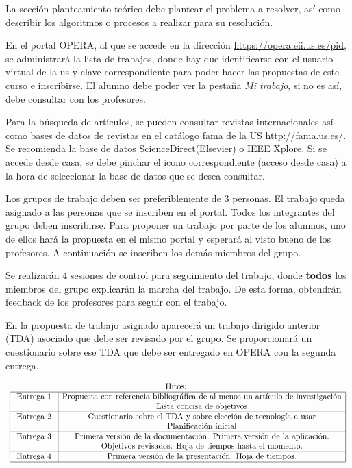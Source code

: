 \documentclass{pid}
\begin{document}
La sección planteamiento teórico debe plantear el problema a resolver, así como describir los algoritmos o procesos a realizar para su resolución.

En el portal OPERA, al que se accede en la dirección \url{https://opera.eii.us.es/pid}, se administrará la lista de trabajos, donde hay que identificarse con el usuario virtual de la us y clave correspondiente para poder hacer las propuestas de este curso e inscribirse. El alumno debe poder ver la pestaña {\it Mi trabajo}, si no es así, debe consultar con los profesores.

Para la búsqueda de artículos, se pueden consultar revistas internacionales así como bases de datos de revistas en el catálogo fama de la US \url{http://fama.us.es/}. Se recomienda la base de datos ScienceDirect(Elsevier) o IEEE Xplore. Si se accede desde casa, se debe pinchar el icono correspondiente (acceso desde casa) a la hora de seleccionar la base de datos que se desea consultar.

Los grupos de trabajo deben ser preferiblemente de $3$ personas. El trabajo queda asignado a las personas que se inscriben en el portal. Todos los integrantes del grupo deben inscribirse. Para proponer un trabajo por parte de los alumnos, uno de ellos hará la propuesta en el mismo portal y esperará al visto bueno de los profesores. A continuación se inscriben los demás miembros del grupo.

Se realizarán $4$ sesiones de control para seguimiento del trabajo, donde {\bf todos} los miembros del grupo explicarán la marcha del trabajo. De esta forma, obtendrán feedback de los profesores para seguir con el trabajo.

 En la propuesta de trabajo asignado aparecerá un trabajo dirigido anterior (TDA) asociado que debe ser revisado por el grupo. Se proporcionará un cuestionario sobre ese TDA que debe ser entregado en OPERA con la segunda entrega.

$$
\begin{array}{c}
\mbox{Hitos: }\\
\begin{array}{|c|c|}\hline
\mbox{ Entrega 1 }& \mbox{Propuesta con referencia bibliográfica de al menos un artículo de investigación}\\
&  \mbox{Lista concisa de objetivos}\\
\hline
\mbox{ Entrega 2  }& \mbox{Cuestionario sobre el TDA y sobre elección de tecnología a usar}\\
& \mbox{Planificación inicial}\\
\hline
\mbox{ Entrega 3 }& \mbox{Primera versión de la documentación. Primera versión de la aplicación.}\\
& \mbox{Objetivos revisados. Hoja de tiempos hasta el momento.}\\
\hline
\mbox{ Entrega 4 }& \mbox{Primera versión de la presentación. Hoja de tiempos.}\\
\hline
\end{array}
\end{array}$$
\end{document}
